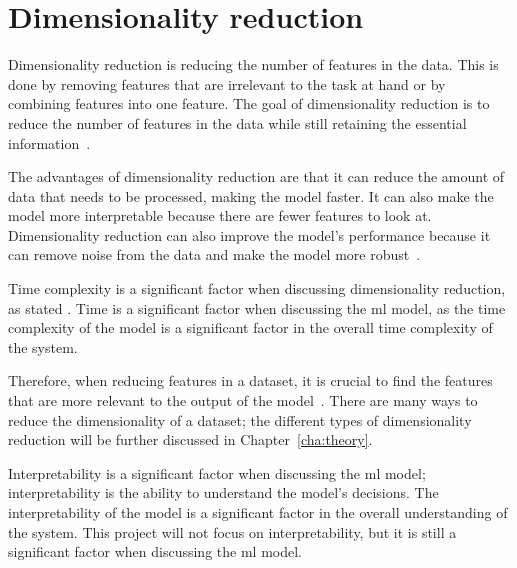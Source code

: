 

\section{Dimensionality reduction}\label{sec:dimensionality-reduction-problem}

Dimensionality reduction is reducing the number of features in the data. This is done by removing features that are irrelevant to the task at hand or by combining features into one feature. The goal of dimensionality reduction is to reduce the number of features in the data while still retaining the essential information~\cite{dimensionality-reduction-cheng}. 

The advantages of dimensionality reduction are that it can reduce the amount of data that needs to be processed, making the model faster. It can also make the model more interpretable because there are fewer features to look at. Dimensionality reduction can also improve the model's performance because it can remove noise from the data and make the model more robust~\cite{dimensionality-reduction-cheng}.

Time complexity is a significant factor when discussing dimensionality reduction, as stated . Time is a significant factor when discussing the \gls{ml} model, as the time complexity of the model is a significant factor in the overall time complexity of the system. 

Therefore, when reducing features in a dataset, it is crucial to find the features that are more relevant to the output of the model~\cite{Feature-engineering-zheng}. There are many ways to reduce the dimensionality of a dataset; the different types of dimensionality reduction will be further discussed in Chapter~\ref{cha:theory}.


 
Interpretability is a significant factor when discussing the \gls{ml} model; interpretability is the ability to understand the model's decisions. The interpretability of the model is a significant factor in the overall understanding of the system. This project will not focus on interpretability, but it is still a significant factor when discussing the \gls{ml} model.
